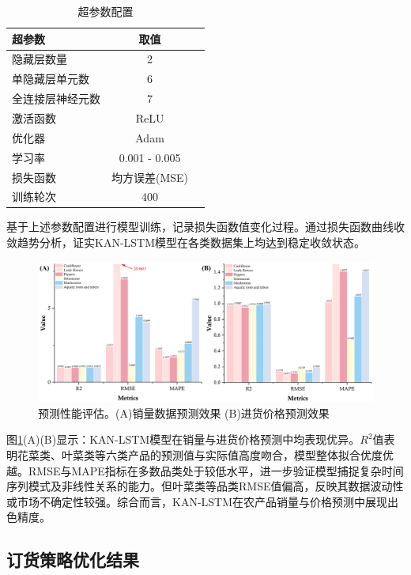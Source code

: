 \documentclass[lang=cn,12pt,a4paper]{elegantpaper}
\begin{document}
\begin{table}[H]
\centering
\caption{超参数配置}
\label{tab:hyperparameters}
\begin{tabular}{lcc}
\toprule
\textbf{超参数} & \textbf{取值} \\
\midrule
隐藏层数量 & 2 \\
单隐藏层单元数 & 6 \\
全连接层神经元数 & 7 \\
激活函数 & ReLU \\
优化器 & Adam \\
学习率 & 0.001 - 0.005 \\
损失函数 & 均方误差(MSE) \\
训练轮次 & 400 \\
\bottomrule
\end{tabular}
\end{table}

基于上述参数配置进行模型训练，记录损失函数值变化过程。通过损失函数曲线收敛趋势分析，证实KAN-LSTM模型在各类数据集上均达到稳定收敛状态。

\begin{figure}[H]
    \centering
    \includegraphics[width=1\textwidth]{图片4.png}
    \caption{预测性能评估。(A)销量数据预测效果 (B)进货价格预测效果}
    \label{fig:fig4}
\end{figure}

图\ref{fig:fig4}(A)(B)显示：KAN-LSTM模型在销量与进货价格预测中均表现优异。$R^2$值表明花菜类、叶菜类等六类产品的预测值与实际值高度吻合，模型整体拟合优度优越。RMSE与MAPE指标在多数品类处于较低水平，进一步验证模型捕捉复杂时间序列模式及非线性关系的能力。但叶菜类等品类RMSE值偏高，反映其数据波动性或市场不确定性较强。综合而言，KAN-LSTM在农产品销量与价格预测中展现出色精度。

\subsection{订货策略优化结果}
\label{subsec:ordering_strategy}
\end{document}
